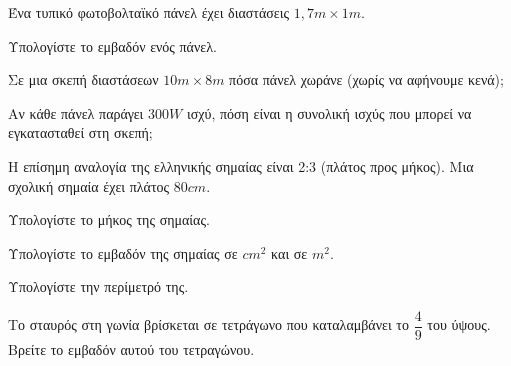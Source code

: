 \documentclass[11pt,a4paper,modern]{FFExercises}
\begin{document}
\askhsh Ένα τυπικό φωτοβολταϊκό πάνελ έχει διαστάσεις $1{,}7\si{m}\times 1\si{m}$.
\begin{alist}
\item Υπολογίστε το εμβαδόν ενός πάνελ.
\item Σε μια σκεπή διαστάσεων $10\si{m}\times 8\si{m}$ πόσα πάνελ χωράνε (χωρίς να αφήνουμε κενά);
\item Αν κάθε πάνελ παράγει $300\si{W}$ ισχύ, πόση είναι η συνολική ισχύς που μπορεί να εγκατασταθεί στη σκεπή;
\end{alist}

\askhsh Η επίσημη αναλογία της ελληνικής σημαίας είναι 2:3 (πλάτος προς μήκος). Μια σχολική σημαία έχει πλάτος $80\si{cm}$.
\begin{alist}
\item Υπολογίστε το μήκος της σημαίας.
\item Υπολογίστε το εμβαδόν της σημαίας σε $\si{cm^2}$ και σε $\si{m^2}$.
\item Υπολογίστε την περίμετρό της.
\item Το σταυρός στη γωνία βρίσκεται σε τετράγωνο που καταλαμβάνει το $\dfrac{4}{9}$ του ύψους. Βρείτε το εμβαδόν αυτού του τετραγώνου.
\end{alist}
\end{document}
